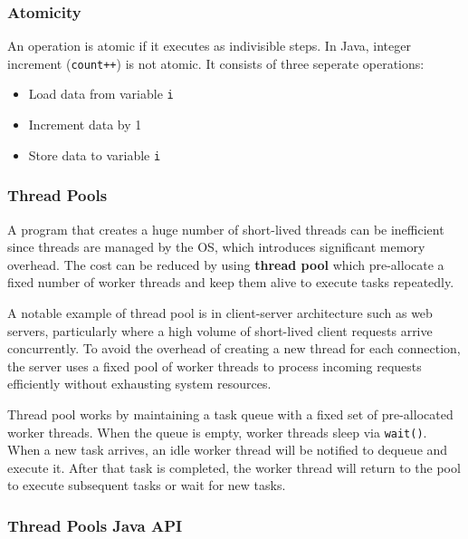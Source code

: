 \documentclass[conference]{IEEEtran}
\begin{document}
\subsubsection{Atomicity}

\noindent An operation is atomic if it executes as indivisible steps. 
In Java, integer increment (\texttt{count++}) is not atomic. It consists of three seperate operations:

\begin{itemize}
    \item[1.] Load data from variable \texttt{i}
    \item[2.] Increment data by 1
    \item[3.] Store data to variable \texttt{i}
\end{itemize}

\subsubsection{Thread Pools}

\noindent A program that creates a huge number of short-lived threads can be inefficient since threads are managed by the OS, which introduces significant memory overhead.
The cost can be reduced by using \textbf{thread pool} which pre-allocate a fixed number of worker threads and keep them alive to execute tasks repeatedly.

\hspace{5pt}

\noindent A notable example of thread pool is in client-server architecture such as web servers, particularly where a high volume of short-lived client requests arrive concurrently.
To avoid the overhead of creating a new thread for each connection, the server uses a fixed pool of worker threads to process incoming requests efficiently without exhausting system resources.

\hspace{5pt}

\noindent Thread pool works by maintaining a task queue with a fixed set of pre-allocated worker threads. 
When the queue is empty, worker threads sleep via \texttt{wait()}.
When a new task arrives, an idle worker thread will be notified to dequeue and execute it.
After that task is completed, the worker thread will return to the pool to execute subsequent tasks or wait for new tasks.

\hspace{5pt}

\subsubsection*{Thread Pools Java API}
\end{document}
